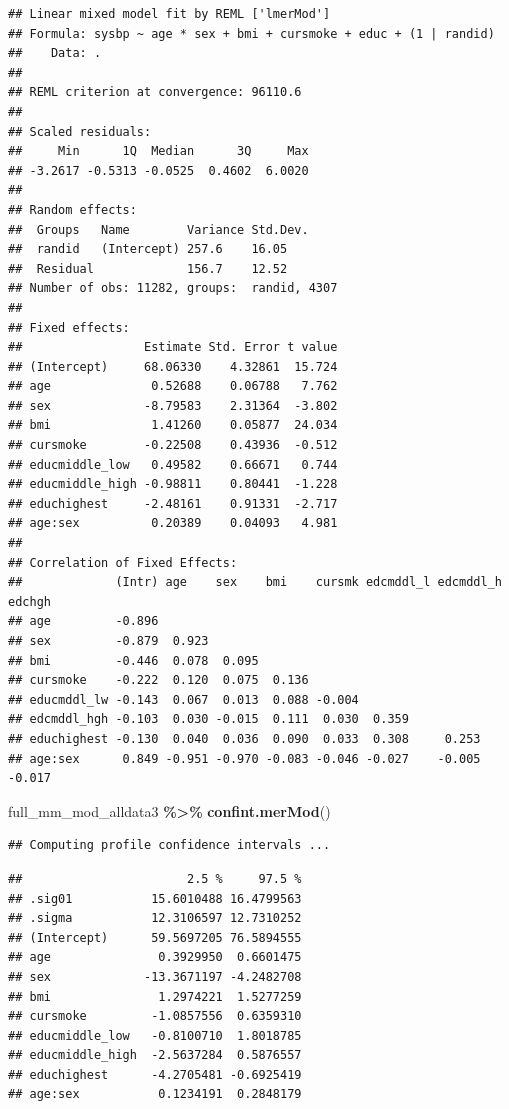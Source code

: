 \documentclass[
]{book}
\newenvironment{Shaded}{\begin{snugshade}}{\end{snugshade}}
\newcommand{\FunctionTok}[1]{\textcolor[rgb]{0.13,0.29,0.53}{\textbf{#1}}}
\newcommand{\NormalTok}[1]{#1}
\newcommand{\SpecialCharTok}[1]{\textcolor[rgb]{0.81,0.36,0.00}{\textbf{#1}}}
\begin{document}
\begin{verbatim}
## Linear mixed model fit by REML ['lmerMod']
## Formula: sysbp ~ age * sex + bmi + cursmoke + educ + (1 | randid)
##    Data: .
## 
## REML criterion at convergence: 96110.6
## 
## Scaled residuals: 
##     Min      1Q  Median      3Q     Max 
## -3.2617 -0.5313 -0.0525  0.4602  6.0020 
## 
## Random effects:
##  Groups   Name        Variance Std.Dev.
##  randid   (Intercept) 257.6    16.05   
##  Residual             156.7    12.52   
## Number of obs: 11282, groups:  randid, 4307
## 
## Fixed effects:
##                 Estimate Std. Error t value
## (Intercept)     68.06330    4.32861  15.724
## age              0.52688    0.06788   7.762
## sex             -8.79583    2.31364  -3.802
## bmi              1.41260    0.05877  24.034
## cursmoke        -0.22508    0.43936  -0.512
## educmiddle_low   0.49582    0.66671   0.744
## educmiddle_high -0.98811    0.80441  -1.228
## educhighest     -2.48161    0.91331  -2.717
## age:sex          0.20389    0.04093   4.981
## 
## Correlation of Fixed Effects:
##             (Intr) age    sex    bmi    cursmk edcmddl_l edcmddl_h edchgh
## age         -0.896                                                       
## sex         -0.879  0.923                                                
## bmi         -0.446  0.078  0.095                                         
## cursmoke    -0.222  0.120  0.075  0.136                                  
## educmddl_lw -0.143  0.067  0.013  0.088 -0.004                           
## edcmddl_hgh -0.103  0.030 -0.015  0.111  0.030  0.359                    
## educhighest -0.130  0.040  0.036  0.090  0.033  0.308     0.253          
## age:sex      0.849 -0.951 -0.970 -0.083 -0.046 -0.027    -0.005    -0.017
\end{verbatim}

\begin{Shaded}
\begin{Highlighting}[]
\NormalTok{full\_mm\_mod\_alldata3 }\SpecialCharTok{\%\textgreater{}\%} 
  \FunctionTok{confint.merMod}\NormalTok{()}
\end{Highlighting}
\end{Shaded}

\begin{verbatim}
## Computing profile confidence intervals ...
\end{verbatim}

\begin{verbatim}
##                       2.5 %     97.5 %
## .sig01           15.6010488 16.4799563
## .sigma           12.3106597 12.7310252
## (Intercept)      59.5697205 76.5894555
## age               0.3929950  0.6601475
## sex             -13.3671197 -4.2482708
## bmi               1.2974221  1.5277259
## cursmoke         -1.0857556  0.6359310
## educmiddle_low   -0.8100710  1.8018785
## educmiddle_high  -2.5637284  0.5876557
## educhighest      -4.2705481 -0.6925419
## age:sex           0.1234191  0.2848179
\end{verbatim}
\end{document}
